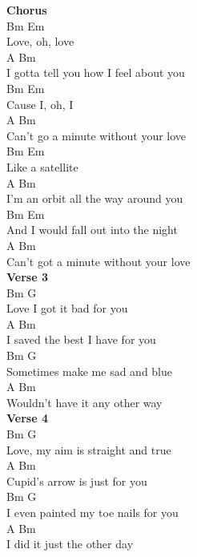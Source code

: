 \documentclass[a4paper]{article}
\begin{document}
{\begin{multicols}
{            }
            \textbf{Chorus}
            ~\\
            {
                \cutive
                \obeyspaces
 Bm        Em
\\
Love, oh, love
\\
         A                    Bm
\\
I gotta tell you how I feel about you
\\
      Bm     Em
\\
Cause I, oh, I
\\
            A                   Bm
\\
Can't go a minute without your love
\\
 Bm           Em
\\
Like a satellite
\\
       A                   Bm
\\
I'm an orbit all the way around you
\\
             Bm                Em
\\
And I would fall out into the night
\\
             A                  Bm
\\
Can't got a minute without your love
\\

            }
            \textbf{Verse 3}
            ~\\
            {
                \cutive
                \obeyspaces
 Bm           G
\\
Love I got it bad for you
\\
   A               Bm
\\
I saved the best I have for you
\\
     Bm           G
\\
Sometimes make me sad and blue
\\
          A                Bm
\\
Wouldn't have it any other way
\\

            }
            \textbf{Verse 4}
            ~\\
            {
                \cutive
                \obeyspaces
  Bm            G
\\
Love, my aim is straight and true
\\
  A              Bm
\\
Cupid's arrow is just for you
\\
     Bm           G
\\
I even painted my toe nails for you
\\
         A              Bm
\\
I did it just the other day
\\

}
\end{multicols}}
\end{document}
